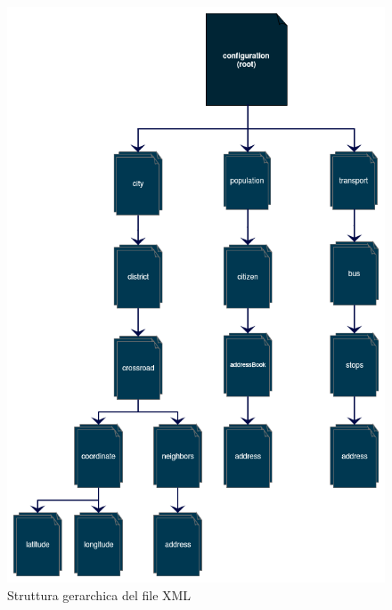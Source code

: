 \begin{figure}[h]
\centering
\includegraphics[scale=0.4]{images/configuration/XML-structure.png}
\caption{Struttura gerarchica del file XML}
\label{setup-configuration-xml-structure}
\end{figure}

